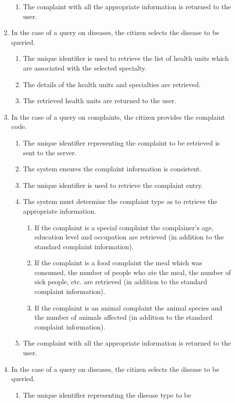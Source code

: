 \documentclass[11pt,twoside]{article}
\begin{document}
\begin{enumerate}
\begin{enumerate}
\begin{enumerate}
\item The complaint with all the appropriate information is returned to
the user.
\end{enumerate}
\item In the case of a query on diseases, the citizen selects the disease to
be queried.
\begin{enumerate}
\item The unique identifier is used to retrieve the list of health units
which are associated with the selected specialty.
\item The details of the health units and specialties are retrieved.
\item The retrieved health units are returned to the user.
\end{enumerate}
\item In the case of a query on complaints, the citizen provides the
complaint code.
\begin{enumerate}
\item The unique identifier representing the complaint to be retrieved
is sent to the server.
\item The system ensures the complaint information is consistent.
\item The unique identifier is used to retrieve the complaint entry.
\item The system must determine the complaint type as to retrieve
the appropriate information.
\begin{enumerate}
\item If the complaint is a special complaint the complainer's
age, education level and occupation are retrieved (in
addition to the standard complaint information).
\item If the complaint is a food complaint the meal which was
consumed, the number of people who ate the meal, the
number of sick people, etc. are retrieved (in addition to
the standard complaint information).
\item If the complaint is an animal complaint the animal
species and the number of animals affected (in addition
to the standard complaint information).
\end{enumerate}
\item The complaint with all the appropriate information is returned to
the user.
\end{enumerate}
\item In the case of a query on diseases, the citizen selects the disease to
be queried.
\begin{enumerate}
\item The unique identifier representing the disease type to be

\end{enumerate}
\end{enumerate}
\end{enumerate}
\end{document}
